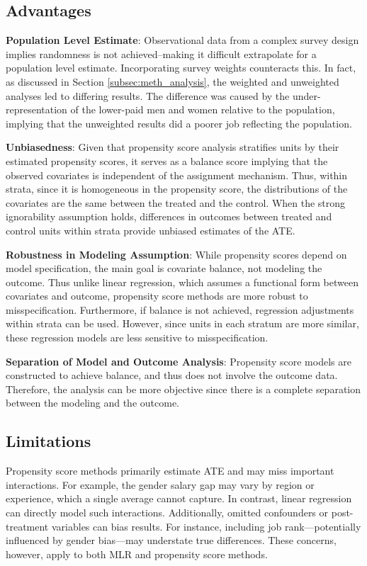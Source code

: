 \documentclass[12pt]{article}
\begin{document}
\subsection{Advantages} \label{subsec:advantages}

\textbf{Population Level Estimate}: Observational data from a complex survey design implies randomness is not achieved--making it difficult extrapolate for a population level estimate. Incorporating survey weights counteracts this. In fact, as discussed in Section \ref{subsec:meth_analysis}, the weighted and unweighted analyses led to differing results. The difference was caused by the under-representation of the lower-paid men and women relative to the population, implying that the unweighted results did a poorer job reflecting the population.

\textbf{Unbiasedness}: Given that propensity score analysis stratifies units by their estimated propensity scores, it serves as a balance score implying that the observed covariates is independent of the assignment mechanism. Thus, within strata, since it is homogeneous in the propensity score, the distributions of the covariates are the same between the treated and the control. When the strong ignorability assumption holds, differences in outcomes between treated and control units within strata provide unbiased estimates of the ATE.

\textbf{Robustness in Modeling Assumption}: While propensity scores depend on model specification, the main goal is covariate balance, not modeling the outcome. Thus unlike linear regression, which assumes a functional form between covariates and outcome, propensity score methods are more robust to misspecification. Furthermore, if balance is not achieved, regression adjustments within strata can be used. However, since units in each stratum are more similar, these regression models are less sensitive to misspecification.

\textbf{Separation of Model and Outcome Analysis}: Propensity score models are constructed to achieve balance, and thus does not involve the outcome data. Therefore, the analysis can be more objective since there is a complete separation between the modeling and the outcome.

\subsection{Limitations} \label{subsec:limitations}

Propensity score methods primarily estimate ATE and may miss important interactions. For example, the gender salary gap may vary by region or experience, which a single average cannot capture. In contrast, linear regression can directly model such interactions. Additionally, omitted confounders or post-treatment variables can bias results. For instance, including job rank—potentially influenced by gender bias—may understate true differences. These concerns, however, apply to both MLR and propensity score methods.
\end{document}
